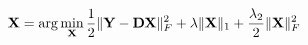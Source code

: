 \documentclass{standalone}
\begin{document}
$ \displaystyle
\mathbf{X} = \arg\min_{\mathbf{X}} \frac{1}{2} \|\mathbf{Y} - \mathbf{D} \mathbf{X}\|_F^2 + \lambda\|\mathbf{X}\|_1 + \frac{\lambda_2}{2} \|\mathbf{X}\|_F^2
$
\end{document}
